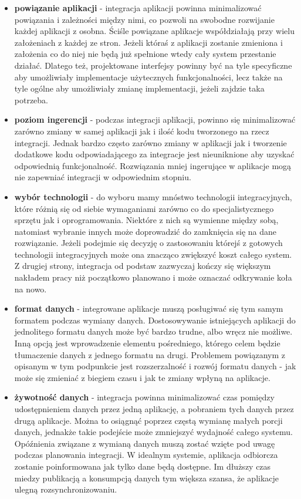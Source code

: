 \begin{itemize}
	\item \textbf{powiązanie aplikacji} - integracja aplikacji powinna minimalizować powiązania i zależności między nimi, co pozwoli na swobodne rozwijanie każdej aplikacji z osobna. Ściśle powiązane aplikacje współdziałają przy wielu założeniach z każdej ze stron. Jeżeli któraś z aplikacji zostanie zmieniona i założenia co do niej nie będą już spełnione wtedy cały system przestanie działać. Dlatego też, projektowane interfejsy powinny być na tyle specyficzne aby umożliwiały implementacje użytecznych funkcjonalności, lecz także na tyle ogólne aby umożliwiały zmianę implementacji, jeżeli zajdzie taka potrzeba.
	\item \textbf{poziom ingerencji} - podczas integracji aplikacji, powinno się minimalizować zarówno zmiany w samej aplikacji jak i ilość kodu tworzonego na rzecz integracji. Jednak bardzo często zarówno zmiany w aplikacji jak i tworzenie dodatkowe kodu odpowiadającego za integracje jest nieuniknione aby uzyskać odpowiednią funkcjonalność. Rozwiązania mniej ingerujące w aplikacje mogą nie zapewniać integracji w odpowiednim stopniu.
	\item \textbf{wybór technologii} - do wyboru mamy mnóstwo technologii integracyjnych, które różnią się od siebie wymaganiami zarówno co do specjalistycznego sprzętu jak i oprogramowania. Niektóre z nich są wymienne między sobą, natomiast wybranie innych może doprowadzić do zamknięcia się na dane rozwiązanie. Jeżeli podejmie się decyzję o zastosowaniu którejś z gotowych technologii integracyjnych może ona znacząco zwiększyć koszt całego system. Z drugiej strony, integracja od podstaw zazwyczaj kończy się większym nakładem pracy niż początkowo planowano i może oznaczać odkrywanie koła na nowo.
	\item \textbf{format danych} - integrowane aplikacje muszą posługiwać się tym samym formatem podczas wymiany danych. Dostosowywanie istniejących aplikacji do jednolitego formatu danych może być bardzo trudne, albo wręcz nie możliwe. Inną opcją jest wprowadzenie elementu pośredniego, którego celem będzie tłumaczenie danych z jednego formatu na drugi. Problemem powiązanym z opisanym w tym podpunkcie jest rozszerzalność i rozwój formatu danych - jak może się zmieniać z biegiem czasu i jak te zmiany wpłyną na aplikacje.
	\item \textbf{żywotność danych} - integracja powinna minimalizować czas pomiędzy udostępnieniem danych przez jedną aplikację, a pobraniem tych danych przez drugą aplikacje. Można to osiągnąć poprzez częstą wymianę małych porcji danych, jednakże takie podejście może zmniejszyć wydajność całego systemu. Opóźnienia związane z wymianą danych muszą zostać wzięte pod uwagę podczas planowania integracji. W idealnym systemie, aplikacja odbiorcza zostanie poinformowana jak tylko dane będą dostępne. Im dłuższy czas miedzy publikacją a konsumpcją danych tym większa szansa, że aplikacje ulegną rozsynchronizowaniu.

\end{itemize}
